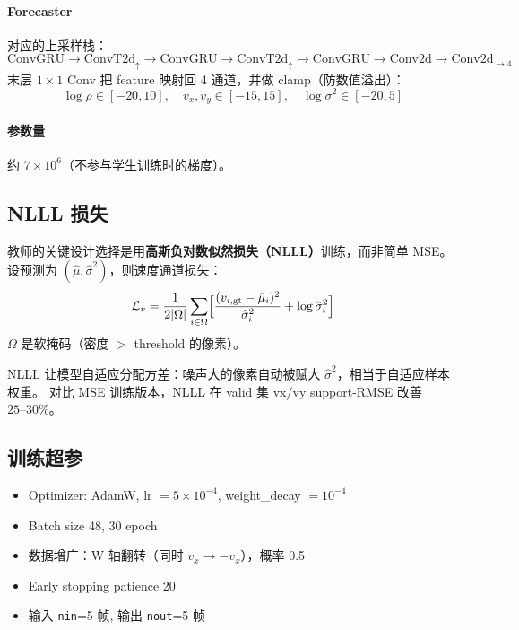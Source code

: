 \documentclass[11pt,a4paper]{ctexart}
\begin{document}
\paragraph{Forecaster}
对应的上采样栈：
\begin{equation*}
\text{ConvGRU}\to \text{ConvT2d}_\uparrow \to \text{ConvGRU} \to \text{ConvT2d}_\uparrow \to \text{ConvGRU} \to \text{Conv2d} \to \text{Conv2d}_{\to 4}
\end{equation*}
末层 $1\times 1$ Conv 把 feature 映射回 4 通道，并做 clamp（防数值溢出）：
\begin{equation*}
\log\rho \in [-20, 10], \quad
v_x, v_y \in [-15, 15], \quad
\log\sigma^2 \in [-20, 5]
\end{equation*}

\paragraph{参数量} 约 $7 \times 10^6$（不参与学生训练时的梯度）。

\subsection{NLLL 损失}

教师的关键设计选择是用\textbf{高斯负对数似然损失（NLLL）}训练，而非简单 MSE。设预测为 $(\hat\mu, \hat\sigma^2)$，则速度通道损失：
\begin{equation}
\mathcal{L}_v = \frac{1}{2|\Omega|}\sum_{i\in\Omega}
\Bigl[
\frac{(v_{i,\mathrm{gt}} - \hat\mu_i)^2}{\hat\sigma_i^2}
+ \log \hat\sigma_i^2
\Bigr]
\end{equation}
$\Omega$ 是软掩码（密度 $>$ threshold 的像素）。

NLLL 让模型自适应分配方差：噪声大的像素自动被赋大 $\hat\sigma^2$，相当于自适应样本权重。
对比 MSE 训练版本，NLLL 在 valid 集 vx/vy support-RMSE 改善 $25\text{--}30\%$。

\subsection{训练超参}

\begin{itemize}
  \item Optimizer: AdamW, lr $=5\times 10^{-4}$, weight\_decay $=10^{-4}$
  \item Batch size 48, 30 epoch
  \item 数据增广：W 轴翻转（同时 $v_x \to -v_x$），概率 0.5
  \item Early stopping patience 20
  \item 输入 \texttt{nin}=5 帧, 输出 \texttt{nout}=5 帧
\end{itemize}
\end{document}
